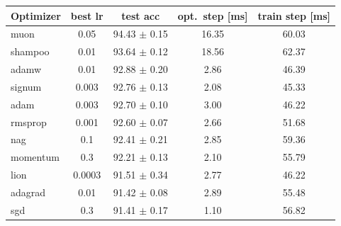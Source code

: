 \begin{tabular}{lcccc}
\toprule
Optimizer & best lr & test acc & opt.\ step [ms] & train step [ms] \\
\midrule
muon & 0.05 & 94.43 $\pm$ 0.15 & 16.35 & 60.03 \\
shampoo & 0.01 & 93.64 $\pm$ 0.12 & 18.56 & 62.37 \\
adamw & 0.01 & 92.88 $\pm$ 0.20 & 2.86 & 46.39 \\
signum & 0.003 & 92.76 $\pm$ 0.13 & 2.08 & 45.33 \\
adam & 0.003 & 92.70 $\pm$ 0.10 & 3.00 & 46.22 \\
rmsprop & 0.001 & 92.60 $\pm$ 0.07 & 2.66 & 51.68 \\
nag & 0.1 & 92.41 $\pm$ 0.21 & 2.85 & 59.36 \\
momentum & 0.3 & 92.21 $\pm$ 0.13 & 2.10 & 55.79 \\
lion & 0.0003 & 91.51 $\pm$ 0.34 & 2.77 & 46.22 \\
adagrad & 0.01 & 91.42 $\pm$ 0.08 & 2.89 & 55.48 \\
sgd & 0.3 & 91.41 $\pm$ 0.17 & 1.10 & 56.82 \\
\bottomrule
\end{tabular}

